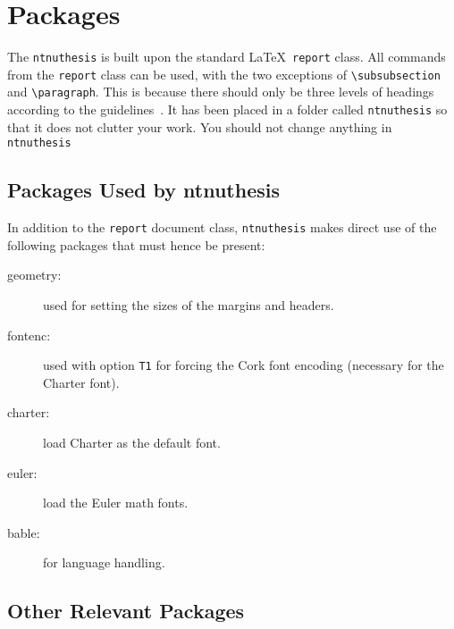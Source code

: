 \chapter{Packages}
\label{chap:packages}

The \texttt{ntnuthesis} is built upon the standard \LaTeX\
\texttt{report} class. All commands from the \texttt{report} class can
be used, with the two exceptions of \verb+\subsubsection+ and
\verb+\paragraph+. This is because there should only be three
levels of headings according to the guidelines~\cite{NTNUMaster}. 
It has been placed in a folder called \texttt{ntnuthesis} so that it does not
clutter your work.  You should not change anything in \texttt{ntnuthesis}

\section{Packages Used by ntnuthesis}
\label{sec:packages}

In addition to the \texttt{report} document class,
\texttt{ntnuthesis} makes direct use of the following packages
that must hence be present:
\begin{description}
	\item[geometry:] used for setting the sizes of the margins and
  	headers.
	\item[fontenc:] used with option \texttt{T1} for forcing the Cork font
  	encoding (necessary for the Charter font).
	\item[charter:] load Charter as the default font.
	\item[euler:] load the Euler math fonts.
	\item[bable:] for language handling.
\end{description}

\section{Other Relevant Packages}
\label{sec:otherpackages}


